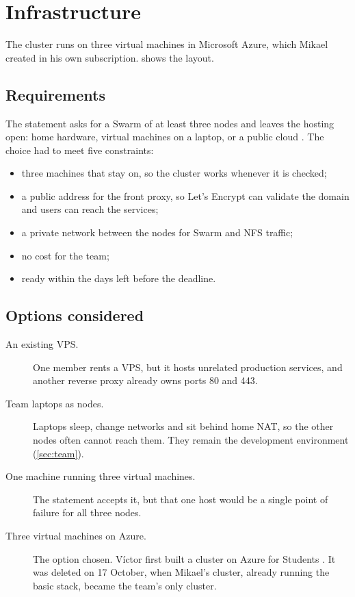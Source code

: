 \section{Infrastructure}
\label{sec:infrastructure}

The cluster runs on three virtual machines in Microsoft Azure, which
Mikael created in his own subscription.  shows the
layout.

\subsection{Requirements}
\label{sec:infra-requirements}

The statement asks for a Swarm of at least three nodes and leaves the
hosting open: home hardware, virtual machines on a laptop, or a public
cloud \parencite{llusa2026project}. The choice had to meet five
constraints:
\begin{itemize}
  \item three machines that stay on, so the cluster works whenever it is
        checked;
  \item a public address for the front proxy, so Let's Encrypt can
        validate the domain and users can reach the services;
  \item a private network between the nodes for Swarm and NFS traffic;
  \item no cost for the team;
  \item ready within the days left before the deadline.
\end{itemize}

\subsection{Options considered}
\label{sec:infra-options}

\begin{description}
  \item[An existing VPS.] One member rents a VPS, but it hosts unrelated
    production services, and another reverse proxy already owns ports 80
    and 443.
  \item[Team laptops as nodes.] Laptops sleep, change networks and sit
    behind home NAT, so the other nodes often cannot reach them. They
    remain the development environment (\cref{sec:team}).
  \item[One machine running three virtual machines.] The statement
    accepts it, but that one host would be a single point of failure for
    all three nodes.
  \item[Three virtual machines on Azure.] The option chosen. Víctor first
    built a cluster on Azure for Students \parencite{azure-students}. It
    was deleted on 17 October, when Mikael's cluster, already running the
    basic stack, became the team's only cluster.
\end{description}

